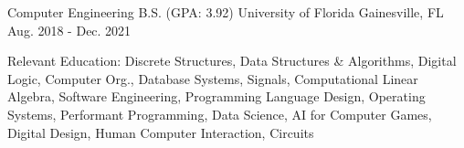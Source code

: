\begin{cventries}
  \cventry
	{Computer Engineering B.S. (GPA: 3.92)}
	{University of Florida}
	{Gainesville, FL}
	{Aug. 2018 - Dec. 2021}
	{
		\begin{cvitems}
			\item {Relevant Education: Discrete Structures, Data Structures \& Algorithms, Digital Logic, Computer Org., Database Systems, Signals, Computational Linear Algebra, Software Engineering, Programming Language Design, Operating Systems, Performant Programming, Data Science, AI for Computer Games, Digital Design, Human Computer Interaction, Circuits}
		\end{cvitems}
	}
\end{cventries}
